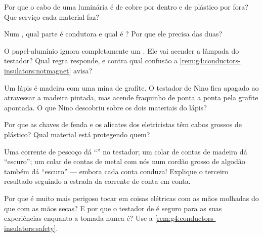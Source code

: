 \begin{exercise}[$\star$]\label{exo:g4:conductors-insulators:5}
Por que o cabo de uma luminária é de cobre por dentro e de plástico
por fora? Que serviço cada material faz?
\end{exercise}

\begin{exercise}[$\star$]\label{exo:g4:conductors-insulators:6}
Num , qual parte é condutora e qual é ? Por que
ele precisa das duas?
\end{exercise}

\begin{exercise}[$\star$]\label{exo:g4:conductors-insulators:7}
O papel-alumínio ignora completamente um . Ele vai acender a
lâmpada do testador? Qual regra responde, e contra qual confusão a
\cref{rem:g4:conductors-insulators:notmagnet} avisa?
\end{exercise}

\begin{exercise}[$\star$]\label{exo:g4:conductors-insulators:8}
Um lápis é madeira com uma mina de grafite. O testador de Nino fica
apagado ao atravessar a madeira pintada, mas acende fraquinho de
ponta a ponta pela grafite apontada. O que Nino descobriu sobre os
dois materiais do lápis?
\end{exercise}

\begin{exercise}[$\star$]\label{exo:g4:conductors-insulators:9}
Por que as chaves de fenda e os alicates dos eletricistas têm cabos
grossos de plástico? Qual material está protegendo quem?
\end{exercise}

\begin{exercise}[$\star\star$]\label{exo:g4:conductors-insulators:10}
Uma corrente de pescoço dá ``'' no testador; um colar de contas de
madeira dá ``escuro''; um colar de contas de metal com nós num
cordão grosso de algodão também dá ``escuro'' --- embora cada conta
conduza! Explique o terceiro resultado seguindo a estrada da corrente
de conta em conta.
\end{exercise}

\begin{exercise}[$\star\star$]\label{exo:g4:conductors-insulators:11}
Por que é muito mais perigoso tocar em coisas elétricas com as mãos
molhadas do que com as mãos secas? E por que o testador de  é
seguro para as suas experiências enquanto a tomada nunca é? Use a
\cref{rem:g4:conductors-insulators:safety}.
\end{exercise}
